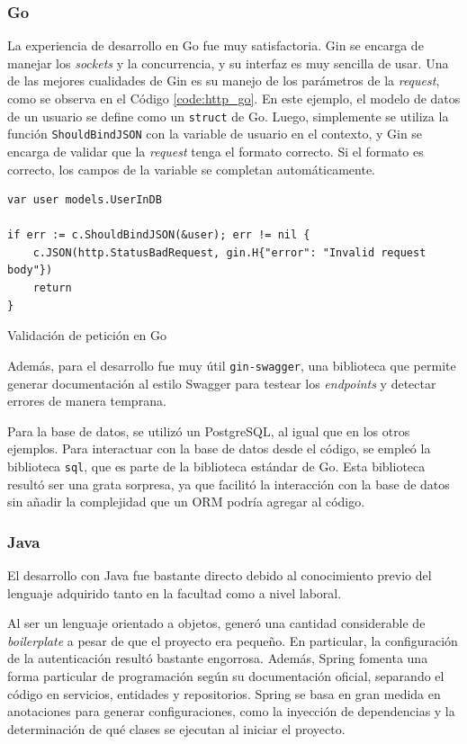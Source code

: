 \documentclass[11pt]{article}
\let\Oldsubsubsection\subsubsection
\renewcommand{\subsubsection}{\FloatBarrier\Oldsubsubsection}
\newcommand{\english}[1]{\textit{#1}}
\begin{document}
\subsubsection{Go}

La experiencia de desarrollo en Go fue muy satisfactoria. Gin se encarga de manejar los \english{sockets} y la concurrencia, y su interfaz es muy sencilla de usar. Una de las mejores cualidades de Gin es su manejo de los parámetros de la \english{request}, como se observa en el Código \ref{code:http_go}. En este ejemplo, el modelo de datos de un usuario se define como un \lstinline{struct} de Go. Luego, simplemente se utiliza la función \lstinline{ShouldBindJSON} con la variable de usuario en el contexto, y Gin se encarga de validar que la \english{request} tenga el formato correcto. Si el formato es correcto, los campos de la variable se completan automáticamente.

\begin{listing}[h]
\begin{verbatim}
var user models.UserInDB

if err := c.ShouldBindJSON(&user); err != nil {
	c.JSON(http.StatusBadRequest, gin.H{"error": "Invalid request body"})
	return
}
\end{verbatim}
\caption{Validación de petición en Go}
\label{code:http_go}
\end{listing}

Además, para el desarrollo fue muy útil \lstinline{gin-swagger}, una biblioteca que permite generar documentación al estilo Swagger para testear los \english{endpoints} y detectar errores de manera temprana.

Para la base de datos, se utilizó un PostgreSQL, al igual que en los otros ejemplos. Para interactuar con la base de datos desde el código, se empleó la biblioteca \lstinline{sql}, que es parte de la biblioteca estándar de Go. Esta biblioteca resultó ser una grata sorpresa, ya que facilitó la interacción con la base de datos sin añadir la complejidad que un ORM podría agregar al código.


\subsubsection{Java}

El desarrollo con Java fue bastante directo debido al conocimiento previo del lenguaje adquirido tanto en la facultad como a nivel laboral.

Al ser un lenguaje orientado a objetos, generó una cantidad considerable de \textit{boilerplate} a pesar de que el proyecto era pequeño. En particular, la configuración de la autenticación resultó bastante engorrosa. Además, Spring fomenta una forma particular de programación según su documentación oficial, separando el código en servicios, entidades y repositorios. Spring se basa en gran medida en anotaciones para generar configuraciones, como la inyección de dependencias y la determinación de qué clases se ejecutan al iniciar el proyecto.
\end{document}
